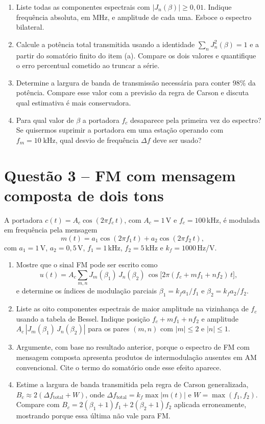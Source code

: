 \documentclass[11pt,a4paper]{article}
\begin{document}
\begin{enumerate}[label=\alph*)]
  \item Liste todas as componentes espectrais com $|J_n(\beta)| \geq 0{,}01$. Indique frequência absoluta, em MHz, e amplitude de cada uma. Esboce o espectro bilateral.
  \item Calcule a potência total transmitida usando a identidade $\sum_{n} J_n^2(\beta) = 1$ e a partir do somatório finito do item (a). Compare os dois valores e quantifique o erro percentual cometido ao truncar a série.
  \item Determine a largura de banda de transmissão necessária para conter $98\%$ da potência. Compare esse valor com a previsão da regra de Carson e discuta qual estimativa é mais conservadora.
  \item Para qual valor de $\beta$ a portadora $f_c$ desaparece pela primeira vez do espectro? Se quisermos suprimir a portadora em uma estação operando com $f_m = 10\;\text{kHz}$, qual desvio de frequência $\Delta f$ deve ser usado?
\end{enumerate}

\section*{Questão 3 -- FM com mensagem composta de dois tons}

A portadora $c(t) = A_c\cos(2\pi f_c\, t)$, com $A_c = 1$\,V e $f_c = 100$\,kHz, é modulada em frequência pela mensagem
\[
  m(t) = a_1\cos(2\pi f_1\,t) + a_2\cos(2\pi f_2\,t),
\]
com $a_1 = 1$\,V, $a_2 = 0{,}5$\,V, $f_1 = 1$\,kHz, $f_2 = 5$\,kHz e $k_f = 1000$\,Hz/V.

\begin{enumerate}[label=\alph*)]
  \item Mostre que o sinal FM pode ser escrito como
  \[
    u(t) = A_c\!\!\sum_{m,n}\!\! J_m(\beta_1)\,J_n(\beta_2)\,\cos\!\big[2\pi(f_c + m f_1 + n f_2)\,t\big],
  \]
  e determine os índices de modulação parciais $\beta_1 = k_f a_1/f_1$ e $\beta_2 = k_f a_2/f_2$.
  \item Liste as oito componentes espectrais de maior amplitude na vizinhança de $f_c$ usando a tabela de Bessel. Indique posição $f_c + m f_1 + n f_2$ e amplitude $A_c\,|J_m(\beta_1)\,J_n(\beta_2)|$ para os pares $(m,n)$ com $|m|\le 2$ e $|n|\le 1$.
  \item Argumente, com base no resultado anterior, porque o espectro de FM com mensagem composta apresenta produtos de intermodulação ausentes em AM convencional. Cite o termo do somatório onde esse efeito aparece.
  \item Estime a largura de banda transmitida pela regra de Carson generalizada, $B_c \approx 2(\Delta f_{\text{total}} + W)$, onde $\Delta f_{\text{total}} = k_f \max|m(t)|$ e $W = \max(f_1, f_2)$. Compare com $B_c = 2(\beta_1 + 1)f_1 + 2(\beta_2 + 1)f_2$ aplicada erroneamente, mostrando porque essa última não vale para FM.
\end{enumerate}
\end{document}
